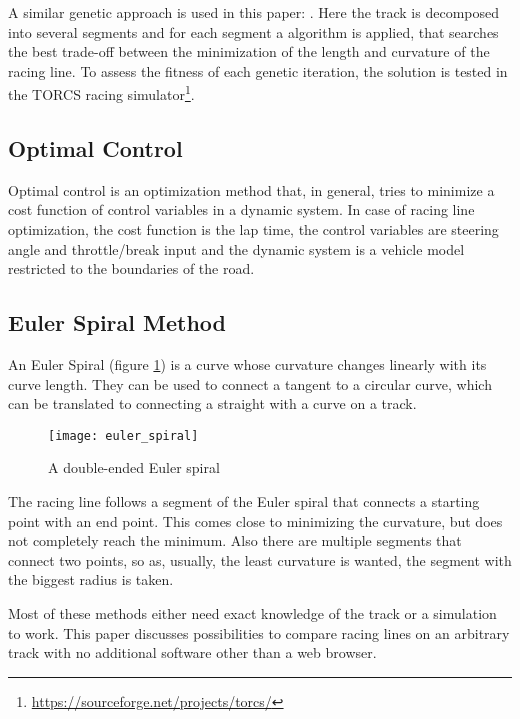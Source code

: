 A similar genetic approach is used in this paper: \cite{cardamone10}. Here the track is decomposed into several segments and for each segment a algorithm is applied, that searches the best trade-off between the minimization of the length and curvature of the racing line. To assess the fitness of each genetic iteration, the solution is tested in the TORCS racing simulator\footnote{\url{https://sourceforge.net/projects/torcs/}}.

\subsection{Optimal Control}
Optimal control is an optimization method that, in general, tries to minimize a cost function of control variables in a dynamic system. In case of racing line optimization, the cost function is the lap time, the control variables are steering angle and throttle/break input and the dynamic system is a vehicle model restricted to the boundaries of the road. \cite{gustafsson08,brayshaw05}

\subsection{Euler Spiral Method}
An Euler Spiral (figure \ref{fig:euler_spiral}) is a curve whose curvature changes linearly with its curve length. They can be used to connect a tangent to a circular curve, which can be translated to connecting a straight with a curve on a track.\\ \cite{xiong09}

\begin{figure}[!ht]
	\centering
	\texttt{[image: euler\_spiral]}
	\caption{A double-ended Euler spiral}
	\label{fig:euler_spiral}
\end{figure}

The racing line follows a segment of the Euler spiral that connects a starting point with an end point. This comes close to minimizing the curvature, but does not completely reach the minimum. Also there are multiple segments that connect two points, so as, usually, the least curvature is wanted, the segment with the biggest radius is taken.

Most of these methods either need exact knowledge of the track or a simulation to work. This paper discusses possibilities to compare racing lines on an arbitrary track with no additional software other than a web browser.

\clearpage